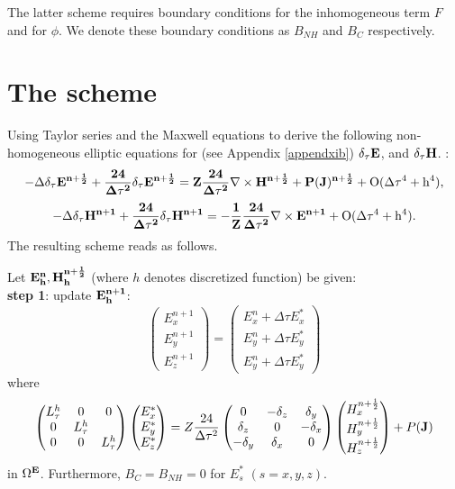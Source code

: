 \documentclass[12pt,reqno]{amsart}
\theoremstyle{definition}
\numberwithin{equation}{section}
\def\Gw{\Omega}     \def\Gx{\Xi}         \def\Gy{\Psi}
\begin{document}
   The latter scheme requires boundary conditions for the inhomogeneous term $F$ and for $\phi$. We denote these boundary conditions as 
   $B_{NH}$ and $B_{C}$ respectively.
   
	\section{The scheme}
	Using  Taylor series and the Maxwell equations to derive the following non-homogeneous elliptic equations for (see Appendix \ref{appendxib})
$	\delta_{\tau} \bf{E}$, and $\delta_{\tau} \bf{H}$.
	:
	$$
	-\Delta\delta_{\tau} \bf{E}^{n+\frac{1}{2}}+\frac{24}{\Delta \tau^2}\delta_{\tau}\bf{E}^{n+\frac{1}{2}}=
	Z\frac{24}{\Delta \tau^2}\nabla\times \bf{H}^{n+\frac{1}{2}}+P(J)^{n+\frac{1}{2}}+
	\mathrm{O(\Delta \tau^4+h^4)},
	$$
		$$
	-\Delta \delta_{\tau}\bf{H}^{n+1}+\frac{24}{\Delta \tau^2}\delta_{\tau}\bf{H}^{n+1}=
	-\frac{1}{Z}\frac{24}{\Delta \tau^2}\nabla\times {\bf E}^{n+1}+
	\mathrm{O(\Delta \tau^4+h^4)}.
	$$
	The resulting scheme reads as follows.
	
	Let $\bf{E}^n_h, \bf{H}^{n+\frac{1}{2}}_h$ (where $h$ denotes discretized function) be given:\\[2mm]
	{\bf step 1}: update $\bf{E}^{n+1}_h$: \\[2mm]
	$$
	\begin{pmatrix}
		E_x^{n+1}\\
		E_y^{n+1}\\
		E_z^{n+1}
	\end{pmatrix}=
	\begin{pmatrix}
		E_x^n+\Delta \tau E_x^{*}\\
		E_y^n+\Delta \tau E_y^{*}\\
		E_y^n+\Delta \tau E_y^{*}
	\end{pmatrix}
	$$
	where 
	$$
	\begin{pmatrix}
		L_{\tau}^{h} & 0&0 \\
		0 & L_{\tau}^{h} &\\
		0&0&L_{\tau}^{h} 
	\end{pmatrix}
	\begin{pmatrix}
		E_x^{*}\\
		E_y^{*} \\
		E_z^{*}
	\end{pmatrix}=Z\frac{24}{\Delta \tau^2}
	\begin{pmatrix}
		0& -\delta_z & \delta _y\\
		\delta_z&0&-\delta_x\\
		-\delta_y&\delta_x&0
	\end{pmatrix}
	\begin{pmatrix}
		H_x^{n+\frac{1}{2}}\\
		H_y^{n+\frac{1}{2}}\\
		H_z^{n+\frac{1}{2}}
	\end{pmatrix}+P({\bf J})
	$$
	in $\Gw^{\bf{E}}$.
	Furthermore,
	$B_{C}=B_{NH}=0$ for $E_s^{*}$ $(s=x,y,z)$.
\end{document}
